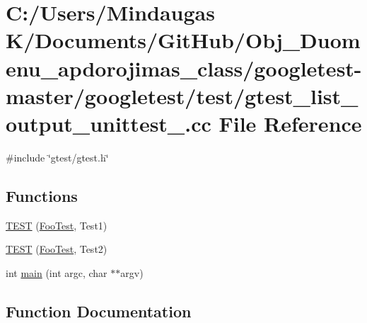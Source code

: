 \hypertarget{googletest-master_2googletest_2test_2gtest__list__output__unittest___8cc}{}\section{C\+:/\+Users/\+Mindaugas K/\+Documents/\+Git\+Hub/\+Obj\+\_\+\+Duomenu\+\_\+apdorojimas\+\_\+class/googletest-\/master/googletest/test/gtest\+\_\+list\+\_\+output\+\_\+unittest\+\_\+.cc File Reference}
\label{googletest-master_2googletest_2test_2gtest__list__output__unittest___8cc}
{\ttfamily \#include \char`\"{}gtest/gtest.\+h\char`\"{}}\newline
\subsection*{Functions}
\begin{DoxyCompactItemize}
\item 
\mbox{\hyperlink{googletest-master_2googletest_2test_2gtest__list__output__unittest___8cc_a0a40c4ec107fc667a7d9e343c956e2ea}{T\+E\+ST}} (\mbox{\hyperlink{class_foo_test}{Foo\+Test}}, Test1)
\item 
\mbox{\hyperlink{googletest-master_2googletest_2test_2gtest__list__output__unittest___8cc_a82ffa2009a6d021453fda5b2523eddb7}{T\+E\+ST}} (\mbox{\hyperlink{class_foo_test}{Foo\+Test}}, Test2)
\item 
int \mbox{\hyperlink{googletest-master_2googletest_2test_2gtest__list__output__unittest___8cc_a3c04138a5bfe5d72780bb7e82a18e627}{main}} (int argc, char $\ast$$\ast$argv)
\end{DoxyCompactItemize}


\subsection{Function Documentation}
\mbox{\label{googletest-master_2googletest_2test_2gtest__list__output__unittest___8cc_a3c04138a5bfe5d72780bb7e82a18e627}} 
